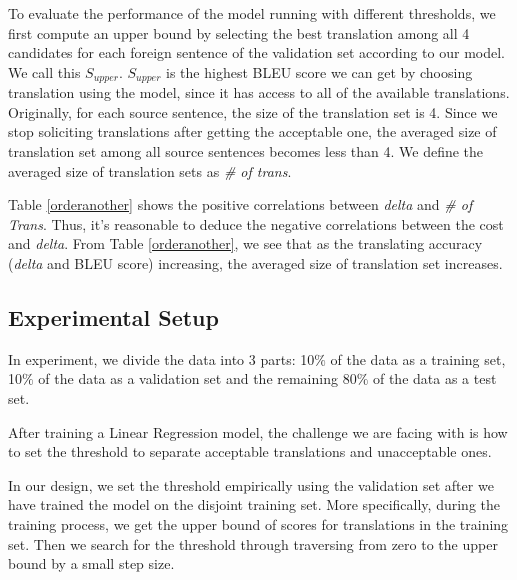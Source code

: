 \documentclass[11pt]{article}
\begin{document}
To evaluate the performance of the model running with different thresholds, we first compute an upper bound by selecting the best translation among all 4 candidates for each foreign sentence of the validation set according to our  model. We call this  $S_{upper}$.  $S_{upper}$ is the highest BLEU score we can get by choosing translation using the model, since it has access to all of the available translations. Originally, for each source sentence, the size of the translation set is 4. Since we stop soliciting translations after getting the acceptable one, the averaged size of translation set among all source sentences becomes less than 4. We define the averaged size of translation sets as \textit{\# of trans}.

Table \ref{orderanother} shows the  positive correlations between  \textit{delta} and \textit{\# of Trans}.
Thus, it's reasonable to deduce the negative correlations between the cost and \textit{delta}.  From Table \ref{orderanother}, we see that as the  translating accuracy (\textit{delta} and BLEU score) increasing, the averaged size of translation set increases.  
 \subsection{Experimental Setup}
 In experiment, we divide the data into 3 parts: 10$\%$ of the data as a training set, 10$\%$ of the data as a validation set and the remaining 80$\%$ of the data as a test set. 

After  training  a Linear Regression model, the challenge we are facing with is how to set the threshold to separate acceptable translations and unacceptable ones. 
 
 
 In our design, we set the threshold empirically using the validation set after we have trained the model on the disjoint training set. More specifically, during the training process, we get the upper bound of scores for translations in the training set. Then we search for the threshold through traversing from  zero to the upper bound by a small step size. %
 
\end{document}

